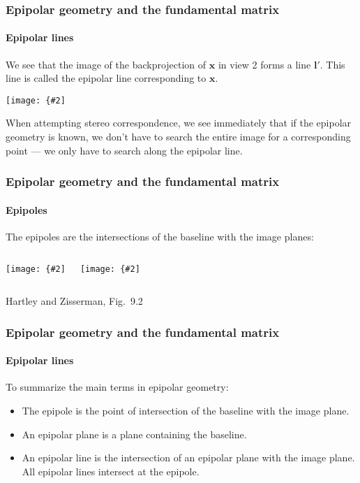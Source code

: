 \documentclass[aspectratio=169]{beamer}
\renewcommand{\vec}[1]{\boldsymbol{#1}}
\def\Rset{\mathbb{R}}
\newcommand{\myfig}[3]{\centerline{\texttt{[image: \{\#2]}}}
    \centerline{\scriptsize #3}}
\begin{document}
\begin{frame}
\frametitle{Epipolar geometry and the fundamental matrix}
\framesubtitle{Epipolar lines}

We see that the image of the backprojection of $\vec{x}$ in view 2
forms a line $\vec{l}'$.  This line is called the \alert{epipolar
line} corresponding to $\vec{x}$.

\myfig{2in}{HZ-fig8-1b}{Hartley and Zisserman (2004), Fig.\ 9.1b}

\medskip

When attempting stereo correspondence, we see immediately that if the
epipolar geometry is known, we don't have to search the entire image
for a corresponding point --- \alert{we only have to search along the
epipolar line}.

\end{frame}

\begin{frame}
\frametitle{Epipolar geometry and the fundamental matrix}
\framesubtitle{Epipoles}

The \alert{epipoles} are the intersections of the baseline with the
image planes:
\begin{columns}
\column{2in}
\myfig{1.9in}{HZ-fig8-2a}{\parbox{1.9in}{The baseline intersects the
image planes at \alert{epipoles} $\vec{e}$ and $\vec{e}'$}}
\column{2in}
\myfig{1.9in}{HZ-fig8-2b}{\parbox{1.9in}{As we move a point $\vec{X}$
in $\Rset^3$, the epipolar planes rotate around the baseline and
always intersect the epipoles.}}
\end{columns}

\medskip

\centerline{\scriptsize Hartley and Zisserman, Fig.\ 9.2}

\end{frame}

\begin{frame}
\frametitle{Epipolar geometry and the fundamental matrix}
\framesubtitle{Epipolar lines}

To summarize the main terms in epipolar geometry:
\begin{itemize}
\item The \alert{epipole} is the point of intersection of the
  baseline with the image plane.
\item An \alert{epipolar plane} is a plane containing the baseline.
\item An \alert{epipolar line} is the intersection of an epipolar
  plane with the image plane.  All epipolar lines intersect at the
  epipole.
\end{itemize}

\end{frame}
\end{document}
